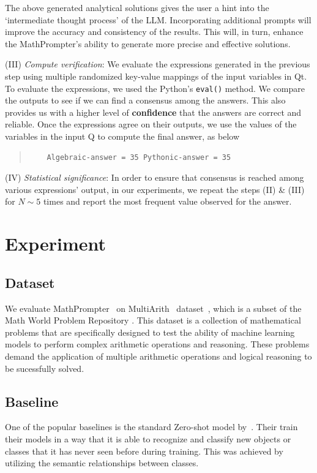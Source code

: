 The above generated analytical solutions gives the user a hint into the `intermediate thought process' of the LLM. Incorporating additional prompts will improve the accuracy and consistency of the results. This will, in turn, enhance the MathPrompter's ability to generate more precise and effective solutions.

(III) \textit{Compute verification}: We evaluate the expressions generated in the previous step using multiple randomized key-value mappings of the input variables in {\color{gray} Qt}. To evaluate the expressions, we used the Python's \texttt{eval()} method. We compare the outputs to see if we can find a consensus among the answers. This also provides us with a higher level of \textbf{confidence} that the answers are correct and reliable. Once the expressions agree on their outputs, we use the values of the variables in the input {\color{gray} Q} to compute the final answer, as below

\begin{quotation}
    \begin{verbatim}
    Algebraic-answer = 35 Pythonic-answer = 35
    \end{verbatim}
\end{quotation}

(IV) \textit{Statistical significance}: In order to ensure that consensus is reached among various expressions' output, in our experiments, we repeat the steps (II) \& (III) for $N\sim5$ times and report the most frequent value observed for the answer. 

\section{Experiment}

\subsection{Dataset}
We evaluate MathPrompter~ on MultiArith~ dataset~\cite{roy2016solving}, which is a subset of the Math World Problem Repository \cite{koncel2016mawps}. This dataset is a collection of mathematical problems that are specifically designed to test the ability of machine learning models to perform complex arithmetic operations and reasoning. These problems demand the application of multiple arithmetic operations and logical reasoning to be sucessfully solved.  

\subsection{Baseline}
One of the popular baselines is the standard Zero-shot model by~\cite{brown2020language}. Their train their models in a way that it is able to recognize and classify new objects or classes that it has never seen before during training. This was achieved by utilizing the semantic relationships between classes.

